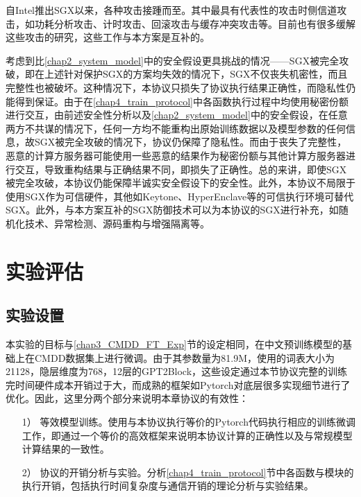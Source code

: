 自Intel推出SGX以来，各种攻击接踵而至。其中最具有代表性的攻击时侧信道攻击，如功耗分析攻击、计时攻击、回滚攻击与缓存冲突攻击等\cite{SGX_Exposure, High_Resolution_Side_Channels, Cache_Attack_SGX, CacheZoom, SGX_Cache, mem_side_hazard, PMFaultFA, VoltJockeyAN}。目前也有很多缓解这些攻击的研究\cite{Oblix, Detecting_privileged_side_channel_attacks, Sanctum, Strong_and_Efficient_Cache_Side_Channel_Protection, T-SGX, minefield, MoLEMO, RepurposingSA}，这些工作与本方案是互补的。

考虑到比\ref{chap2_system_model}中的安全假设更具挑战的情况——SGX被完全攻破，即在上述针对保护SGX的方案均失效的情况下，SGX不仅丧失机密性，而且完整性也被破坏。这种情况下，本协议只损失了协议执行结果正确性，而隐私性仍能得到保证。由于在\ref{chap4_train_protocol}中各函数执行过程中均使用秘密份额进行交互，由前述安全性分析以及\ref{chap2_system_model}中的安全假设，在任意两方不共谋的情况下，任何一方均不能重构出原始训练数据以及模型参数的任何信息，故SGX被完全攻破的情况下，协议仍保障了隐私性。而由于丧失了完整性，恶意的计算方服务器可能使用一些恶意的结果作为秘密份额与其他计算方服务器进行交互，导致重构结果与正确结果不同，即损失了正确性。总的来讲，即使SGX被完全攻破，本协议仍能保障半诚实安全假设下的安全性。此外，本协议不局限于使用SGX作为可信硬件，其他如Keytone\cite{keystone}、HyperEnclave\cite{hyperenclave}等的可信执行环境可替代SGX。此外，与本方案互补的SGX防御技术可以为本协议的SGX进行补充，如随机化技术、异常检测、源码重构与增强隔离等。

\section{实验评估}

\subsection{实验设置} \label{chap4_exp_setting}


本实验的目标与\ref{chap3_CMDD_FT_Exp}节的设定相同，在中文预训练模型的基础上在CMDD数据集上进行微调。由于其参数量为81.9M，使用的词表大小为21128，隐层维度为768，12层的GPT2Block，这些设定通过本节协议完整的训练完时间硬件成本开销过于大，而成熟的框架如Pytorch对底层很多实现细节进行了优化。因此，这里分两个部分来说明本章协议的有效性：

\begin{itemize}
	\item[1）]等效模型训练。使用与本协议执行等价的Pytorch代码执行相应的训练微调工作，即通过一个等价的高效框架来说明本协议计算的正确性以及与常规模型计算结果的一致性。
	\item[2）]协议的开销分析与实验。分析\ref{chap4_train_protocol}节中各函数与模块的执行开销，包括执行时间复杂度与通信开销的理论分析与实验结果。
\end{itemize}

